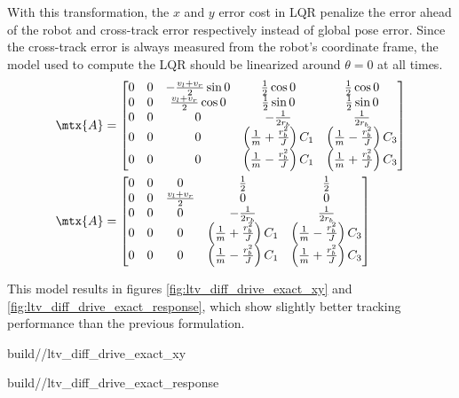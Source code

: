With this transformation, the $x$ and $y$ error cost in LQR penalize the error
ahead of the robot and cross-track error respectively instead of global pose
error. Since the cross-track error is always measured from the robot's
coordinate frame, the \gls{model} used to compute the LQR should be linearized
around $\theta = 0$ at all times.
\begin{align*}
  \mtx{A} &=
  \begin{bmatrix}
    0 & 0 & -\frac{v_l + v_r}{2}\sin 0 & \frac{1}{2}\cos 0 &
      \frac{1}{2}\cos 0 \\
    0 & 0 & \frac{v_l + v_r}{2}\cos 0 & \frac{1}{2}\sin 0 &
      \frac{1}{2}\sin 0 \\
    0 & 0 & 0 & -\frac{1}{2r_b} & \frac{1}{2r_b} \\
    0 & 0 & 0 & \left(\frac{1}{m} + \frac{r_b^2}{J}\right) C_1 &
      \left(\frac{1}{m} - \frac{r_b^2}{J}\right) C_3 \\
    0 & 0 & 0 & \left(\frac{1}{m} - \frac{r_b^2}{J}\right) C_1 &
      \left(\frac{1}{m} + \frac{r_b^2}{J}\right) C_3
  \end{bmatrix} \\
  \mtx{A} &=
  \begin{bmatrix}
    0 & 0 & 0 & \frac{1}{2} & \frac{1}{2} \\
    0 & 0 & \frac{v_l + v_r}{2} & 0 & 0 \\
    0 & 0 & 0 & -\frac{1}{2r_b} & \frac{1}{2r_b} \\
    0 & 0 & 0 & \left(\frac{1}{m} + \frac{r_b^2}{J}\right) C_1 &
      \left(\frac{1}{m} - \frac{r_b^2}{J}\right) C_3 \\
    0 & 0 & 0 & \left(\frac{1}{m} - \frac{r_b^2}{J}\right) C_1 &
      \left(\frac{1}{m} + \frac{r_b^2}{J}\right) C_3
  \end{bmatrix}
\end{align*}

This \gls{model} results in figures \ref{fig:ltv_diff_drive_exact_xy} and
\ref{fig:ltv_diff_drive_exact_response}, which show slightly better
tracking performance than the previous formulation.
\begin{bookfigure}
  \begin{minisvg}{2}{build/\chapterpath/ltv_diff_drive_exact_xy}
    \caption{Linear time-varying differential drive controller x-y plot}
    \label{fig:ltv_diff_drive_exact_xy}
  \end{minisvg}
  \hfill
  \begin{minisvg}{2}{build/\chapterpath/ltv_diff_drive_exact_response}
    \caption{Linear time-varying differential drive controller response}
    \label{fig:ltv_diff_drive_exact_response}
  \end{minisvg}
\end{bookfigure}

